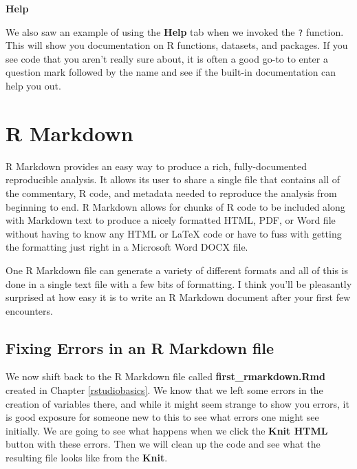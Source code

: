 \documentclass[]{tufte-book}
\theoremstyle{definition}
\theoremstyle{definition}
\theoremstyle{remark}
\begin{document}
\vspace*{0.2in}

\noindent\textbf{Help}\vspace*{0.1in}

We also saw an example of using the \textbf{Help} tab when we invoked
the \texttt{?} function. This will show you documentation on R
functions, datasets, and packages. If you see code that you aren't
really sure about, it is often a good go-to to enter a question mark
followed by the name and see if the built-in documentation can help you
out.

\chapter{R Markdown}\label{rmarkdown}

R Markdown provides an easy way to produce a rich, fully-documented
reproducible analysis. It allows its user to share a single file that
contains all of the commentary, R code, and metadata needed to reproduce
the analysis from beginning to end. R Markdown allows for chunks of R
code to be included along with Markdown text to produce a nicely
formatted HTML, PDF, or Word file without having to know any HTML or
LaTeX code or have to fuss with getting the formatting just right in a
Microsoft Word DOCX file.

One R Markdown file can generate a variety of different formats and all
of this is done in a single text file with a few bits of formatting. I
think you'll be pleasantly surprised at how easy it is to write an R
Markdown document after your first few encounters.

\section{Fixing Errors in an R Markdown file}\label{fixerrors}

We now shift back to the R Markdown file called
\textbf{first\_rmarkdown.Rmd} created in Chapter \ref{rstudiobasics}. We
know that we left some errors in the creation of variables there, and
while it might seem strange to show you errors, it is good exposure for
someone new to this to see what errors one might see initially. We are
going to see what happens when we click the \textbf{Knit HTML} button
with these errors. Then we will clean up the code and see what the
resulting file looks like from the \textbf{Knit}.

\vspace{0.1in}
\end{document}
